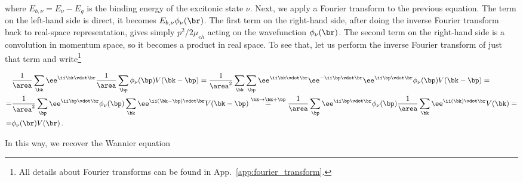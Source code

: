 \noindent where $ E_{b,\nu} = E_{\nu} - E_g$ is the binding energy of the excitonic state $\nu$.
Next, we apply a Fourier transform to the previous equation.
The term on the left-hand side is direct, it becomes $ E_{b,\nu} \phi_{\nu} (\br)$.
The first term on the right-hand side, after doing the inverse Fourier transform back to real-space representation, gives simply $p^2/2 \mu_{eh}$ acting on the wavefunction $\phi_{\nu} (\br)$.
The second term on the right-hand side is a convolution in momentum space, so it becomes a product in real space.
To see that, let us perform the inverse Fourier transform of just that term and write\footnote{All details about Fourier transforms can be found in App.~\ref{app:fourier_transform}.}

\begin{equation}
    \label{eq:potential_inverse_Fourier_transform}
\begin{aligned}
     &\frac{1}{\area} \sum_{\bk} \ee^{\ii \bk \vdot \br} \frac{1}{\area} \sum_{\bp} \phi_{\nu} (\bp) V(\bk - \bp) = \frac{1}{\area^2} \sum_{\bk} \sum_{\bp} \ee^{\ii \bk \vdot \br} \ee^{-\ii \bp \vdot \br} \ee^{\ii \bp \vdot \br} \phi_{\nu} (\bp) V(\bk - \bp) = \\
    =& \frac{1}{\area^2} \sum_{\bp} \ee^{\ii \bp \vdot \br} \phi_{\nu} (\bp) \sum_{\bk} \ee^{\ii (\bk - \bp) \vdot \br} V(\bk - \bp) \overset{\bk \to \bk + \bp}{=} \frac{1}{\area} \sum_{\bp} \ee^{\ii \bp \vdot \br} \phi_{\nu} (\bp) \frac{1}{\area}  \sum_{\bk} \ee^{\ii (\bk) \vdot \br} V(\bk) = \\
    =& \phi_{\nu} (\br) V(\br)\,.
\end{aligned}
\end{equation}

\noindent In this way, we recover the Wannier equation






